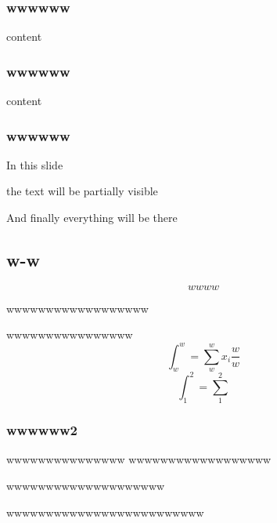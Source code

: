 \documentclass[11pt,aspectratio=1610,spanish]{beamer}
\begin{document}
\subsubsection{wwwwww}
\begin{frame}
	content
\end{frame}

\subsubsection{wwwwww}
\begin{frame}
	content
\end{frame}

\subsubsection{wwwwww}
\begin{frame}
	In this slide \pause

	the text will be partially visible \pause

	And finally everything will be there
\end{frame}

\subsection{w-w}
\begin{frame}
	\begin{equation}\label{key}
		wwww
	\end{equation}
	\begin{theorem}
		wwwwwwwwwwwwwwwwww
	\end{theorem}
	wwwwwwwwwwwwwwww
	\[ \int_{w}^{w}= \sum_{w}^{w}x_i\frac{w}{w} \]
	\[ \int_{1}^{2}=\sum_{1}^{2} \]
\end{frame}

\subsubsection{wwwwww2}

 
\begin{frame}
	\begin{alertblock}{wwwwwwwwwwwwwww}
		wwwwwwwwwwwwwwwwww
	\end{alertblock}
	\begin{example}
		wwwwwwwwwwwwwwwwwwww
	\end{example}
	\begin{lemma}
		wwwwwwwwwwwwwwwwwwwwwwwww
	\end{lemma}
\end{frame}
\end{document}
